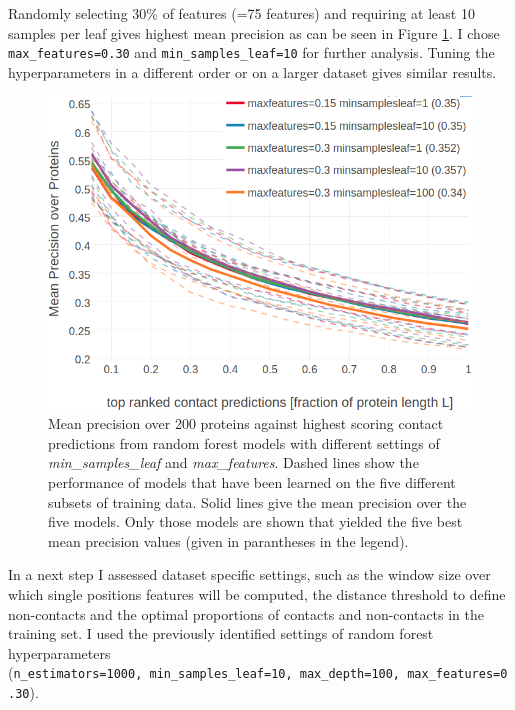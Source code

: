 \documentclass[11pt,a4paper,twoside]{book}
\theoremstyle{definition}
\theoremstyle{definition}
\theoremstyle{remark}
\begin{document}
Randomly selecting 30\% of features (=75 features) and requiring at
least 10 samples per leaf gives highest mean precision as can be seen in
Figure \ref{fig:rf-gridsearch-maxdepth-minsampleleaf}. I chose
\texttt{max\_features=0.30} and \texttt{min\_samples\_leaf=10} for
further analysis. Tuning the hyperparameters in a different order or on
a larger dataset gives similar results.










\begin{figure}

{\centering \includegraphics[width=0.9\linewidth]{img/random_forest_contact_prior/new_gridsearch/precision_vs_rank_cv_on_test_random_forest_maxfeatures_minsampleleaf_top5_notitle} 

}

\caption{Mean precision over 200
proteins against highest scoring contact predictions from random forest
models with different settings of \emph{min\_samples\_leaf} and
\emph{max\_features}. Dashed lines show the performance of models that
have been learned on the five different subsets of training data. Solid
lines give the mean precision over the five models. Only those models
are shown that yielded the five best mean precision values (given in
parantheses in the legend).}\label{fig:rf-gridsearch-maxdepth-minsampleleaf}
\end{figure}

In a next step I assessed dataset specific settings, such as the window
size over which single positions features will be computed, the distance
threshold to define non-contacts and the optimal proportions of contacts
and non-contacts in the training set. I used the previously identified
settings of random forest hyperparameters
(\texttt{n\_estimators=1000,\ min\_samples\_leaf=10,\ max\_depth=100,\ max\_features=0.30}).
\end{document}

